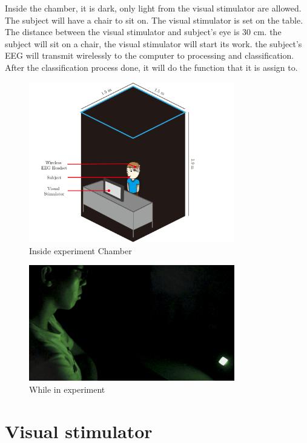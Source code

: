 Inside the chamber, it is dark, only light from the visual stimulator are allowed. The subject will have a chair to sit on. The visual stimulator is set on the table. The distance between the visual stimulator and subject's eye is 30 cm. the subject will sit on a chair, the visual stimulator will start its work. the subject's EEG will transmit wirelessly to the computer to processing and classification. After the classification process done, it will do the function that it is assign to. \\
\begin{figure}[ht]
	\centering
	\includegraphics[width=0.8\textwidth]{chapter6/dark_wire_inside.pdf}
	\caption{Inside experiment Chamber}
\end{figure}

\begin{figure}[ht]
	\centering
	\includegraphics[width=0.8\textwidth]{chapter6/experi.jpg}
	\caption{While in experiment}
\end{figure}

\section{Visual stimulator}

